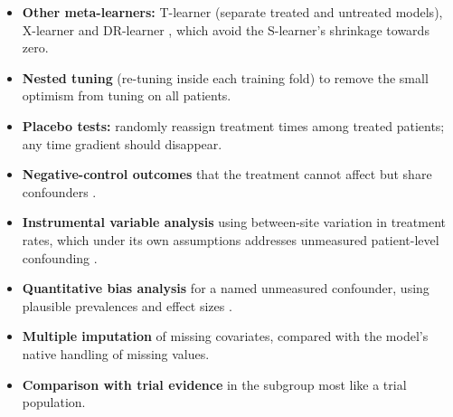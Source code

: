 \begin{itemize}
\item \textbf{Other meta-learners:} T-learner (separate treated and untreated models), X-learner \cite{kunzel2019} and DR-learner \cite{kennedy2023}, which avoid the S-learner's shrinkage towards zero.
\item \textbf{Nested tuning} (re-tuning inside each training fold) to remove the small optimism from tuning on all patients.
\item \textbf{Placebo tests:} randomly reassign treatment times among treated patients; any time gradient should disappear.
\item \textbf{Negative-control outcomes} that the treatment cannot affect but share confounders \cite{lipsitch2010}.
\item \textbf{Instrumental variable analysis} using between-site variation in treatment rates, which under its own assumptions addresses unmeasured patient-level confounding \cite{baiocchi2014}.
\item \textbf{Quantitative bias analysis} for a named unmeasured confounder, using plausible prevalences and effect sizes \cite{lash2014}.
\item \textbf{Multiple imputation} of missing covariates, compared with the model's native handling of missing values.
\item \textbf{Comparison with trial evidence} in the subgroup most like a trial population.
\end{itemize}
